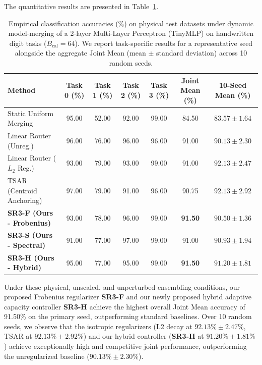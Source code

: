 The quantitative results are presented in Table~\ref{tab:physical_results}. 

\begin{table}[t]
\caption{Empirical classification accuracies ($\%$) on physical test datasets under dynamic model-merging of a 2-layer Multi-Layer Perceptron (TinyMLP) on handwritten digit tasks ($B_{\text{cal}}=64$). We report task-specific results for a representative seed alongside the aggregate Joint Mean (mean $\pm$ standard deviation) across 10 random seeds.}
\label{tab:physical_results}
\vskip 0.15in
\begin{center}
\begin{small}
\begin{sc}
\begin{tabular}{lcccccc}
\toprule
Method & Task 0 (\%) & Task 1 (\%) & Task 2 (\%) & Task 3 (\%) & Joint Mean (\%) & 10-Seed Mean (\%) \\
\midrule
Static Uniform Merging   & 95.00 & 52.00 & 92.00 & 99.00 & 84.50 & $83.57 \pm 1.64$ \\
Linear Router (Unreg.)   & 96.00 & 76.00 & 96.00 & 96.00 & 91.00 & $90.13 \pm 2.30$ \\
Linear Router ($L_2$ Reg.) & 93.00 & 79.00 & 93.00 & 99.00 & 91.00 & $92.13 \pm 2.47$ \\
TSAR (Centroid Anchoring)& 97.00 & 79.00 & 91.00 & 96.00 & 90.75 & $92.13 \pm 2.92$ \\
\midrule
\textbf{SR3-F (Ours - Frobenius)} & 93.00 & 78.00 & 96.00 & 99.00 & \textbf{91.50} & $90.50 \pm 1.36$ \\
\textbf{SR3-S (Ours - Spectral)}  & 91.00 & 77.00 & 97.00 & 99.00 & 91.00 & $90.93 \pm 1.94$ \\
\textbf{SR3-H (Ours - Hybrid)}    & 95.00 & 77.00 & 95.00 & 99.00 & \textbf{91.50} & $91.20 \pm 1.81$ \\
\bottomrule
\end{tabular}
\end{sc}
\end{small}
\end{center}
\vskip -0.1in
\end{table}

Under these physical, unscaled, and unperturbed ensembling conditions, our proposed Frobenius regularizer \textbf{SR3-F} and our newly proposed hybrid adaptive capacity controller \textbf{SR3-H} achieve the highest overall Joint Mean accuracy of 91.50\% on the primary seed, outperforming standard baselines. Over 10 random seeds, we observe that the isotropic regularizers (L2 decay at $92.13\% \pm 2.47\%$, TSAR at $92.13\% \pm 2.92\%$) and our hybrid controller (\textbf{SR3-H} at $91.20\% \pm 1.81\%$) achieve exceptionally high and competitive joint performance, outperforming the unregularized baseline ($90.13\% \pm 2.30\%$). 


